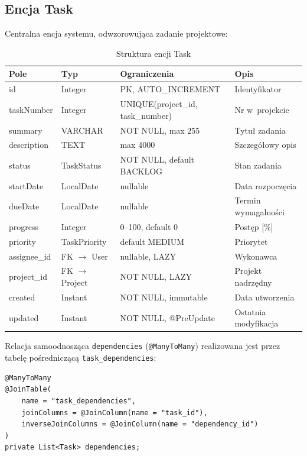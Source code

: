 \subsection{Encja Task}

Centralna encja systemu, odwzorowująca zadanie projektowe:

\begin{table}[H]
\centering
\caption{Struktura encji Task}
\label{tab:task_entity}
\begin{tabular}{|l|l|l|l|}
\hline
\textbf{Pole} & \textbf{Typ} & \textbf{Ograniczenia} & \textbf{Opis} \\ \hline
id & Integer & PK, AUTO\_INCREMENT & Identyfikator \\ \hline
taskNumber & Integer & UNIQUE(project\_id, task\_number) & Nr w~projekcie \\ \hline
summary & VARCHAR & NOT NULL, max 255 & Tytuł zadania \\ \hline
description & TEXT & max 4000 & Szczegółowy opis \\ \hline
status & TaskStatus & NOT NULL, default BACKLOG & Stan zadania \\ \hline
startDate & LocalDate & nullable & Data rozpoczęcia \\ \hline
dueDate & LocalDate & nullable & Termin wymagalności \\ \hline
progress & Integer & 0--100, default 0 & Postęp [\%] \\ \hline
priority & TaskPriority & default MEDIUM & Priorytet \\ \hline
assignee\_id & FK $\rightarrow$ User & nullable, LAZY & Wykonawca \\ \hline
project\_id & FK $\rightarrow$ Project & NOT NULL, LAZY & Projekt nadrzędny \\ \hline
created & Instant & NOT NULL, immutable & Data utworzenia \\ \hline
updated & Instant & NOT NULL, @PreUpdate & Ostatnia modyfikacja \\ \hline
\end{tabular}
\end{table}

\noindent Relacja samoodnosząca \texttt{dependencies} (\texttt{@ManyToMany}) realizowana jest przez tabelę pośredniczącą \texttt{task\_dependencies}:

\begin{verbatim}
@ManyToMany
@JoinTable(
    name = "task_dependencies",
    joinColumns = @JoinColumn(name = "task_id"),
    inverseJoinColumns = @JoinColumn(name = "dependency_id")
)
private List<Task> dependencies;
\end{verbatim}

